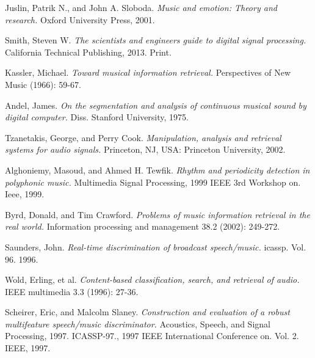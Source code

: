 \newpage
{}
\begin{thebibliography}{9}
                Juslin, Patrik N., and John A. Sloboda. 
                \emph{Music and emotion: Theory and research.} 
                Oxford University Press, 2001.

                Smith, Steven W.
                \emph{The scientists and engineers guide to digital signal processing.}
                California Technical Publishing, 2013. Print.

                Kassler, Michael. 
                \emph{Toward musical information retrieval.} 
                Perspectives of New Music (1966): 59-67.

                Andel, James. 
                \emph{On the segmentation and analysis of continuous musical sound by digital computer.} 
                Diss. Stanford University, 1975.

                Tzanetakis, George, and Perry Cook. 
                \emph{Manipulation, analysis and retrieval systems for audio signals.} 
                Princeton, NJ, USA: Princeton University, 2002.

                Alghoniemy, Masoud, and Ahmed H. Tewfik. 
                \emph{Rhythm and periodicity detection in polyphonic music.} 
                Multimedia Signal Processing, 1999 IEEE 3rd Workshop on. Ieee, 1999.

                Byrd, Donald, and Tim Crawford. 
                \emph{Problems of music information retrieval in the real world.} 
                Information processing and management 38.2 (2002): 249-272.

                Saunders, John. 
                \emph{Real-time discrimination of broadcast speech/music.} 
                icassp. Vol. 96. 1996.

                Wold, Erling, et al. 
                \emph{Content-based classification, search, and retrieval of audio.} 
                IEEE multimedia 3.3 (1996): 27-36.

                Scheirer, Eric, and Malcolm Slaney. 
                \emph{Construction and evaluation of a robust multifeature speech/music discriminator.} 
                Acoustics, Speech, and Signal Processing, 1997. ICASSP-97., 1997 IEEE International Conference on. Vol. 2. IEEE, 1997.


\end{thebibliography}
